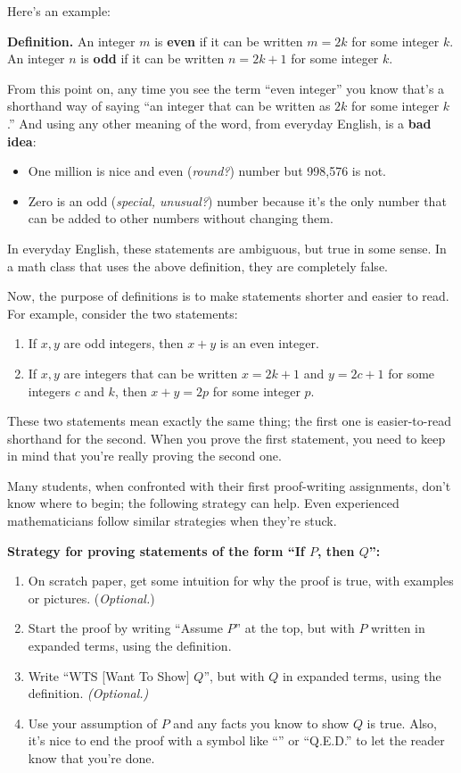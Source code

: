 \documentclass[11pt, letterpaper]{report}
\newcounter{example}[section]
\newenvironment{definition}{\begin{bbox}\par\noindent\textbf{Definition. }}
  {\end{bbox}}
\newlength\oldfboxsep%
\newlength\myminiwidth%
\newenvironment{bbox}{%
  \setlength\oldfboxsep\fboxsep
  \setlength{\fboxsep}{.1in}%
  \setlength\myminiwidth\linewidth%
  \addtolength\myminiwidth{-0.2in}%
  \vspace{0.1in}%
  \begin{lrbox}{\bboxbox}\begin{minipage}{\myminiwidth}%
    }{%
    \end{minipage}\end{lrbox}%
  \noindent\fbox{\usebox{\bboxbox}}\vspace{0.1in}\setlength\fboxsep\oldfboxsep%
}
\begin{document}
Here's an example:

\begin{definition}
An integer $m$ is \textbf{even} if it can be written $m=2k$ for some integer $k$. An integer $n$ is \textbf{odd} if it can be written $n=2k+1$ for some integer $k$.
\end{definition}
From this point on, any time you see the term ``even integer'' you know that's a shorthand way of saying ``an integer that can be written as $2k$ for some integer $k$.'' And using any other meaning of the word, from everyday English, is a \textbf{bad idea}:
\begin{itemize}
\item One million is nice and even (\emph{round?}) number but 998,576 is not.
\item Zero is an odd (\emph{special, unusual?}) number because it's the only number that can be added to other numbers without changing them.
\end{itemize}
In everyday English, these statements are ambiguous, but true in some sense. In a math class that uses the above definition, they are completely false.

Now, the purpose of definitions is to make statements shorter and easier to read. For example, consider the two statements:
\begin{enumerate}
\item If $x,y$ are odd integers, then $x+y$ is an even integer.
\item If $x,y$ are integers that can be written $x=2k+1$ and $y=2c+1$ for some integers $c$ and $k$, then $x+y=2p$ for some integer $p$.
\end{enumerate}
These two statements mean exactly the same thing; the first one is easier-to-read shorthand for the second. When you prove the first statement, you need to keep in mind that you're really proving the second one.

Many students, when confronted with their first proof-writing assignments, don't know where to begin; the following strategy can help. Even experienced mathematicians follow similar strategies when they're stuck.

\begin{bbox}
\textbf{Strategy for proving statements of the form ``If $P$, then $Q$'':}
\begin{enumerate}
\item  On scratch paper, get some intuition for why the proof is true, with examples or pictures. (\emph{Optional.})
\item Start the proof by writing ``Assume $P$'' at the top, but with $P$ written in expanded terms, using the definition.
\item Write ``WTS [Want To Show] $Q$'', but with $Q$ in expanded terms, using the definition. \emph{(Optional.)}
\item Use your assumption of $P$ and any facts you know to show $Q$ is true. Also, it's nice to end the proof with a symbol like ``\blacksquare'' or ``Q.E.D.'' to let the reader know that you're done.
\end{enumerate}
\end{bbox}
\end{document}
